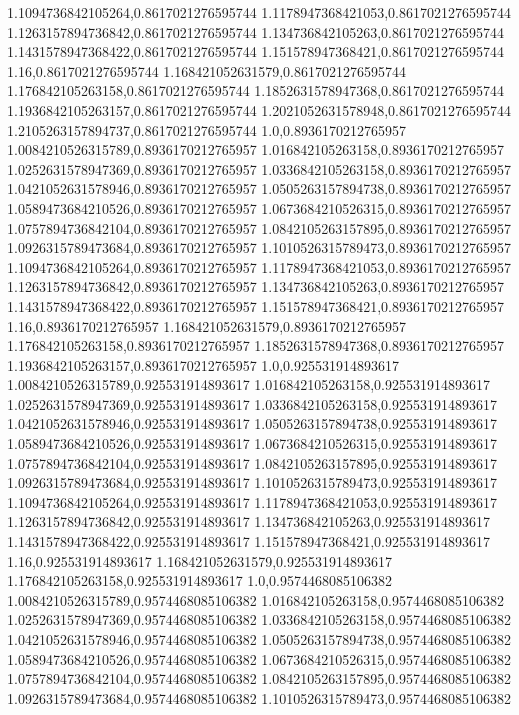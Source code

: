 1.1094736842105264,0.8617021276595744
1.1178947368421053,0.8617021276595744
1.1263157894736842,0.8617021276595744
1.134736842105263,0.8617021276595744
1.1431578947368422,0.8617021276595744
1.151578947368421,0.8617021276595744
1.16,0.8617021276595744
1.168421052631579,0.8617021276595744
1.176842105263158,0.8617021276595744
1.1852631578947368,0.8617021276595744
1.1936842105263157,0.8617021276595744
1.2021052631578948,0.8617021276595744
1.2105263157894737,0.8617021276595744
1.0,0.8936170212765957
1.0084210526315789,0.8936170212765957
1.016842105263158,0.8936170212765957
1.0252631578947369,0.8936170212765957
1.0336842105263158,0.8936170212765957
1.0421052631578946,0.8936170212765957
1.0505263157894738,0.8936170212765957
1.0589473684210526,0.8936170212765957
1.0673684210526315,0.8936170212765957
1.0757894736842104,0.8936170212765957
1.0842105263157895,0.8936170212765957
1.0926315789473684,0.8936170212765957
1.1010526315789473,0.8936170212765957
1.1094736842105264,0.8936170212765957
1.1178947368421053,0.8936170212765957
1.1263157894736842,0.8936170212765957
1.134736842105263,0.8936170212765957
1.1431578947368422,0.8936170212765957
1.151578947368421,0.8936170212765957
1.16,0.8936170212765957
1.168421052631579,0.8936170212765957
1.176842105263158,0.8936170212765957
1.1852631578947368,0.8936170212765957
1.1936842105263157,0.8936170212765957
1.0,0.925531914893617
1.0084210526315789,0.925531914893617
1.016842105263158,0.925531914893617
1.0252631578947369,0.925531914893617
1.0336842105263158,0.925531914893617
1.0421052631578946,0.925531914893617
1.0505263157894738,0.925531914893617
1.0589473684210526,0.925531914893617
1.0673684210526315,0.925531914893617
1.0757894736842104,0.925531914893617
1.0842105263157895,0.925531914893617
1.0926315789473684,0.925531914893617
1.1010526315789473,0.925531914893617
1.1094736842105264,0.925531914893617
1.1178947368421053,0.925531914893617
1.1263157894736842,0.925531914893617
1.134736842105263,0.925531914893617
1.1431578947368422,0.925531914893617
1.151578947368421,0.925531914893617
1.16,0.925531914893617
1.168421052631579,0.925531914893617
1.176842105263158,0.925531914893617
1.0,0.9574468085106382
1.0084210526315789,0.9574468085106382
1.016842105263158,0.9574468085106382
1.0252631578947369,0.9574468085106382
1.0336842105263158,0.9574468085106382
1.0421052631578946,0.9574468085106382
1.0505263157894738,0.9574468085106382
1.0589473684210526,0.9574468085106382
1.0673684210526315,0.9574468085106382
1.0757894736842104,0.9574468085106382
1.0842105263157895,0.9574468085106382
1.0926315789473684,0.9574468085106382
1.1010526315789473,0.9574468085106382

